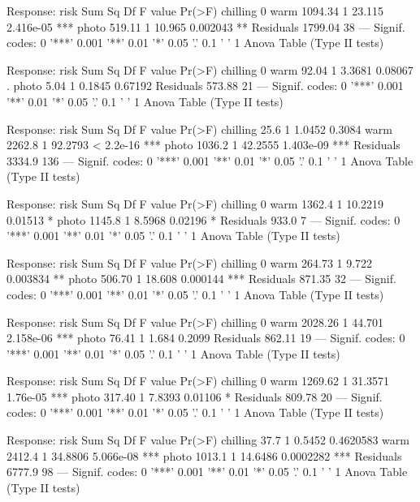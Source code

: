 \documentclass{article}\usepackage[]{graphicx}\usepackage[]{color}
\begin{document}
Response: risk
           Sum Sq Df F value    Pr(>F)    
chilling           0                      
warm      1094.34  1  23.115 2.416e-05 ***
photo      519.11  1  10.965  0.002043 ** 
Residuals 1799.04 38                      
---
Signif. codes:  0 '***' 0.001 '**' 0.01 '*' 0.05 '.' 0.1 ' ' 1
Anova Table (Type II tests)

Response: risk
          Sum Sq Df F value  Pr(>F)  
chilling          0                  
warm       92.04  1  3.3681 0.08067 .
photo       5.04  1  0.1845 0.67192  
Residuals 573.88 21                  
---
Signif. codes:  0 '***' 0.001 '**' 0.01 '*' 0.05 '.' 0.1 ' ' 1
Anova Table (Type II tests)

Response: risk
          Sum Sq  Df F value    Pr(>F)    
chilling    25.6   1  1.0452    0.3084    
warm      2262.8   1 92.2793 < 2.2e-16 ***
photo     1036.2   1 42.2555 1.403e-09 ***
Residuals 3334.9 136                      
---
Signif. codes:  0 '***' 0.001 '**' 0.01 '*' 0.05 '.' 0.1 ' ' 1
Anova Table (Type II tests)

Response: risk
          Sum Sq Df F value  Pr(>F)  
chilling          0                  
warm      1362.4  1 10.2219 0.01513 *
photo     1145.8  1  8.5968 0.02196 *
Residuals  933.0  7                  
---
Signif. codes:  0 '***' 0.001 '**' 0.01 '*' 0.05 '.' 0.1 ' ' 1
Anova Table (Type II tests)

Response: risk
          Sum Sq Df F value   Pr(>F)    
chilling          0                     
warm      264.73  1   9.722 0.003834 ** 
photo     506.70  1  18.608 0.000144 ***
Residuals 871.35 32                     
---
Signif. codes:  0 '***' 0.001 '**' 0.01 '*' 0.05 '.' 0.1 ' ' 1
Anova Table (Type II tests)

Response: risk
           Sum Sq Df F value    Pr(>F)    
chilling           0                      
warm      2028.26  1  44.701 2.158e-06 ***
photo       76.41  1   1.684    0.2099    
Residuals  862.11 19                      
---
Signif. codes:  0 '***' 0.001 '**' 0.01 '*' 0.05 '.' 0.1 ' ' 1
Anova Table (Type II tests)

Response: risk
           Sum Sq Df F value   Pr(>F)    
chilling           0                     
warm      1269.62  1 31.3571 1.76e-05 ***
photo      317.40  1  7.8393  0.01106 *  
Residuals  809.78 20                     
---
Signif. codes:  0 '***' 0.001 '**' 0.01 '*' 0.05 '.' 0.1 ' ' 1
Anova Table (Type II tests)

Response: risk
          Sum Sq Df F value    Pr(>F)    
chilling    37.7  1  0.5452 0.4620583    
warm      2412.4  1 34.8806 5.066e-08 ***
photo     1013.1  1 14.6486 0.0002282 ***
Residuals 6777.9 98                      
---
Signif. codes:  0 '***' 0.001 '**' 0.01 '*' 0.05 '.' 0.1 ' ' 1
Anova Table (Type II tests)
\end{document}
